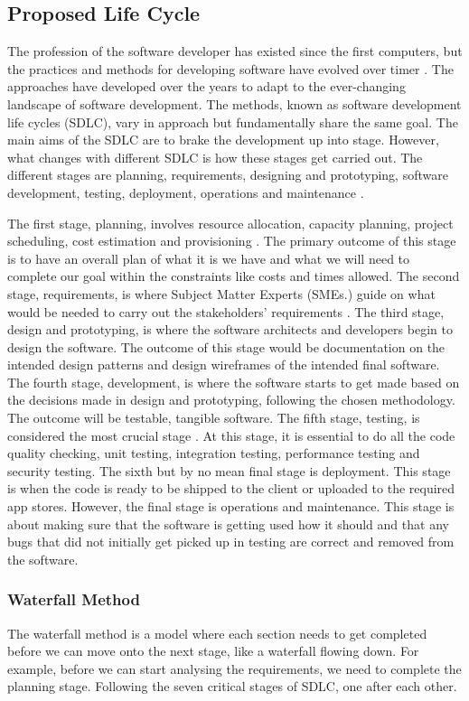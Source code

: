 \documentclass[a4paper,10pt]{article}
\begin{document}
\subsection{Proposed Life Cycle}
The profession of the software developer has existed since the first computers, but the practices and methods for developing software have evolved over timer \cite{SDLC}. The approaches have developed over the years to adapt to the ever-changing landscape of software development. The methods, known as software development life cycles (SDLC), vary in approach but fundamentally share the same goal. The main aims of the SDLC are to brake the development up into stage. However, what changes with different SDLC is how these stages get carried out. The different stages are planning, requirements, designing and prototyping, software development, testing, deployment, operations and maintenance \cite{SDLC}.

The first stage, planning, involves resource allocation, capacity planning, project scheduling, cost estimation and provisioning \cite{SDLC}. The primary outcome of this stage is to have an overall plan of what it is we have and what we will need to complete our goal within the constraints like costs and times allowed. The second stage, requirements, is where Subject Matter Experts (SMEs.) guide on what would be needed to carry out the stakeholders' requirements \cite{SDLC}. The third stage, design and prototyping, is where the software architects and developers begin to design the software. The outcome of this stage would be documentation on the intended design patterns and design wireframes of the intended final software. The fourth stage, development, is where the software starts to get made based on the decisions made in design and prototyping, following the chosen methodology. The outcome will be testable, tangible software. The fifth stage, testing, is considered the most crucial stage \cite{SDLC}. At this stage, it is essential to do all the code quality checking, unit testing, integration testing, performance testing and security testing. The sixth but by no mean final stage is deployment. This stage is when the code is ready to be shipped to the client or uploaded to the required app stores. However, the final stage is operations and maintenance. This stage is about making sure that the software is getting used how it should and that any bugs that did not initially get picked up in testing are correct and removed from the software. 

\subsubsection{Waterfall Method}
The waterfall method is a model where each section needs to get completed before we can move onto the next stage, like a waterfall flowing down. For example, before we can start analysing the requirements, we need to complete the planning stage. Following the seven critical stages of SDLC, one after each other.
\end{document}
